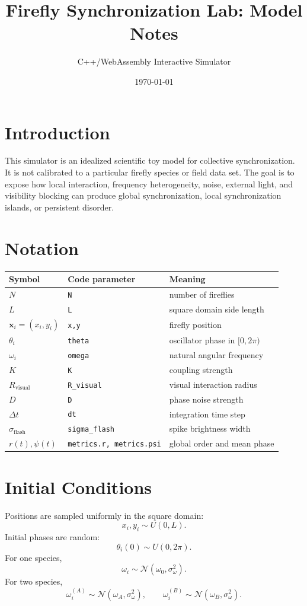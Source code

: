 \documentclass[11pt]{article}
\title{Firefly Synchronization Lab: Model Notes}
\author{C++/WebAssembly Interactive Simulator}
\date{\today}
\begin{document}
\maketitle

\section{Introduction}
This simulator is an idealized scientific toy model for collective synchronization. It is not calibrated to a particular firefly species or field data set. The goal is to expose how local interaction, frequency heterogeneity, noise, external light, and visibility blocking can produce global synchronization, local synchronization islands, or persistent disorder.

\section{Notation}
\begin{center}
\begin{tabular}{lll}
\toprule
Symbol & Code parameter & Meaning \\
\midrule
$N$ & \texttt{N} & number of fireflies \\
$L$ & \texttt{L} & square domain side length \\
$\mathbf{x}_i=(x_i,y_i)$ & \texttt{x,y} & firefly position \\
$\theta_i$ & \texttt{theta} & oscillator phase in $[0,2\pi)$ \\
$\omega_i$ & \texttt{omega} & natural angular frequency \\
$K$ & \texttt{K} & coupling strength \\
$R_{\mathrm{visual}}$ & \texttt{R\_visual} & visual interaction radius \\
$D$ & \texttt{D} & phase noise strength \\
$\Delta t$ & \texttt{dt} & integration time step \\
$\sigma_{\mathrm{flash}}$ & \texttt{sigma\_flash} & spike brightness width \\
$r(t),\psi(t)$ & \texttt{metrics.r, metrics.psi} & global order and mean phase \\
\bottomrule
\end{tabular}
\end{center}

\section{Initial Conditions}
Positions are sampled uniformly in the square domain:
\[
x_i,y_i\sim U(0,L).
\]
Initial phases are random:
\[
\theta_i(0)\sim U(0,2\pi).
\]
For one species,
\[
\omega_i\sim \mathcal{N}(\omega_0,\sigma_\omega^2).
\]
For two species,
\[
\omega_i^{(A)}\sim \mathcal{N}(\omega_A,\sigma_\omega^2),\qquad
\omega_i^{(B)}\sim \mathcal{N}(\omega_B,\sigma_\omega^2).
\]
\end{document}
